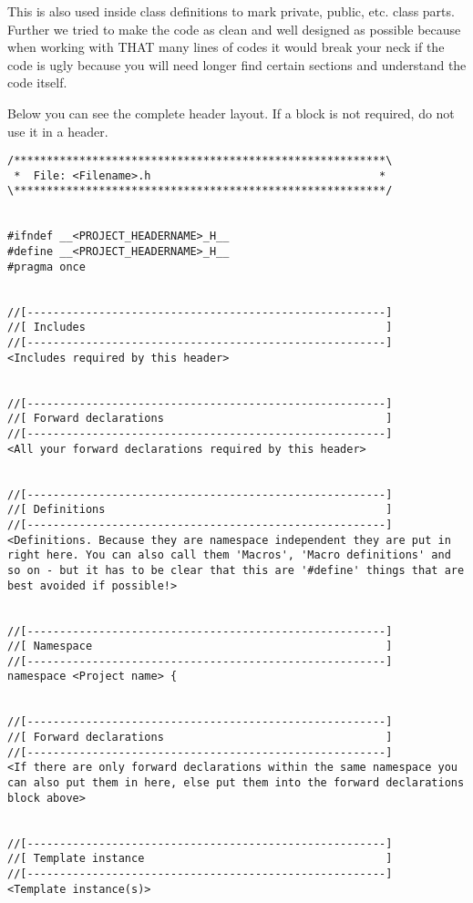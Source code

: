 This is also used inside class definitions to mark private, public, etc. class parts. Further we tried to make the code as clean and well designed as possible because when working with THAT many lines of codes it would break your neck if the code is ugly because you will need longer find certain sections and understand the code itself.

Below you can see the complete header layout. If a block is not required, do not use it in a header.

\begin{lstlisting}[caption=Complete header layout]
/*********************************************************\
 *  File: <Filename>.h                                   *
\*********************************************************/


#ifndef __<PROJECT_HEADERNAME>_H__
#define __<PROJECT_HEADERNAME>_H__
#pragma once


//[-------------------------------------------------------]
//[ Includes                                              ]
//[-------------------------------------------------------]
<Includes required by this header>


//[-------------------------------------------------------]
//[ Forward declarations                                  ]
//[-------------------------------------------------------]
<All your forward declarations required by this header>


//[-------------------------------------------------------]
//[ Definitions                                           ]
//[-------------------------------------------------------]
<Definitions. Because they are namespace independent they are put in right here. You can also call them 'Macros', 'Macro definitions' and so on - but it has to be clear that this are '#define' things that are best avoided if possible!>


//[-------------------------------------------------------]
//[ Namespace                                             ]
//[-------------------------------------------------------]
namespace <Project name> {


//[-------------------------------------------------------]
//[ Forward declarations                                  ]
//[-------------------------------------------------------]
<If there are only forward declarations within the same namespace you can also put them in here, else put them into the forward declarations block above>


//[-------------------------------------------------------]
//[ Template instance                                     ]
//[-------------------------------------------------------]
<Template instance(s)>



\end{lstlisting}
